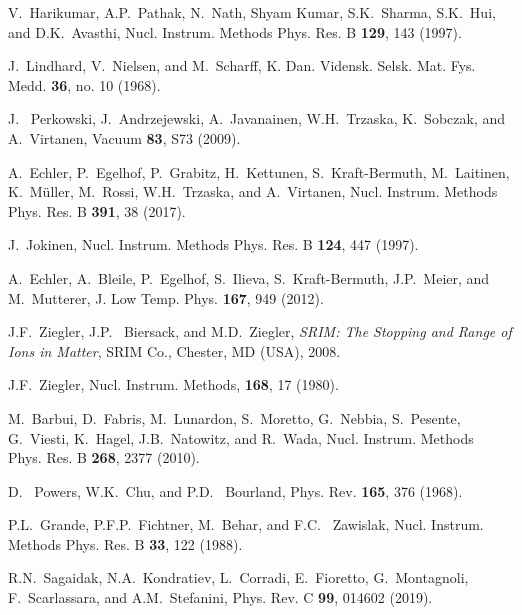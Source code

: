 \documentclass[aps,pra,twocolumn,amsmath,amssymb,floatfix]{revtex4-2}
\begin{document}
\begin{thebibliography}{99}
 V.~Harikumar, A.P.~Pathak, N.~Nath, Shyam Kumar, S.K.~Sharma, S.K.~Hui, and D.K.~Avasthi,
 Nucl. Instrum. Methods Phys. Res. B \textbf{129}, 143 (1997).

 J.~Lindhard, V.~Nielsen, and M.~Scharff,
 K. Dan. Vidensk. Selsk. Mat. Fys. Medd. \textbf{36}, no. 10 (1968).

 J.~ Perkowski, J.~Andrzejewski, A.~Javanainen, W.H.~Trza\-s\-ka, K.~Sobczak, and A.~Virtanen,
 Vacuum \textbf{83}, S73 (2009).

 A.~Echler, P.~Egelhof, P.~Grabitz, H.~Kettunen, S.~Kraft-Bermuth, M.~Laitinen, K.~M\"{u}ller, M.~Rossi, W.H.~Trzaska, and A.~Virtanen,
 Nucl. Instrum. Methods Phys. Res. B \textbf{391}, 38 (2017).

 J.~Jokinen,
 Nucl. Instrum. Methods Phys. Res. B \textbf{124}, 447 (1997).

 A.~Echler, A.~Bleile, P.~Egelhof, S.~Ilieva, S.~Kraft-Bermuth, J.P.~Meier, and M.~Mutterer,
 J. Low Temp. Phys. \textbf{167}, 949 (2012).

 J.F.~Ziegler, J.P.~ Biersack, and M.D.~Ziegler, \textit{SRIM: The Stopping and Range of Ions in Matter}, SRIM Co.,
 Chester, MD (USA), 2008.

 J.F.~Ziegler,
 Nucl. Instrum. Methods, \textbf{168}, 17 (1980).

 M.~Barbui, D.~Fabris, M.~Lunardon, S.~Moretto, G.~Nebbia, S.~Pesente, G.~Viesti, K.~Hagel, J.B.~Natowitz, and R.~Wada,
 Nucl. Instrum. Methods Phys. Res. B \textbf{268}, 2377 (2010).
 
  D.~ Powers, W.K.~Chu, and P.D.~ Bourland,
  Phys. Rev. \textbf{165}, 376 (1968).
  
  P.L.~Grande, P.F.P.~Fichtner, M.~Behar, and F.C.~ Zawislak,
  Nucl. Instrum. Methods Phys. Res. B \textbf{33}, 122 (1988).

 R.N.~Sagaidak, N.A.~Kondratiev, L.~Corradi, E.~Fioretto, G.~Montagnoli, F.~Scarlassara, and A.M.~Stefanini,
 Phys. Rev. C \textbf{99}, 014602 (2019).

\end{thebibliography}
\end{document}
